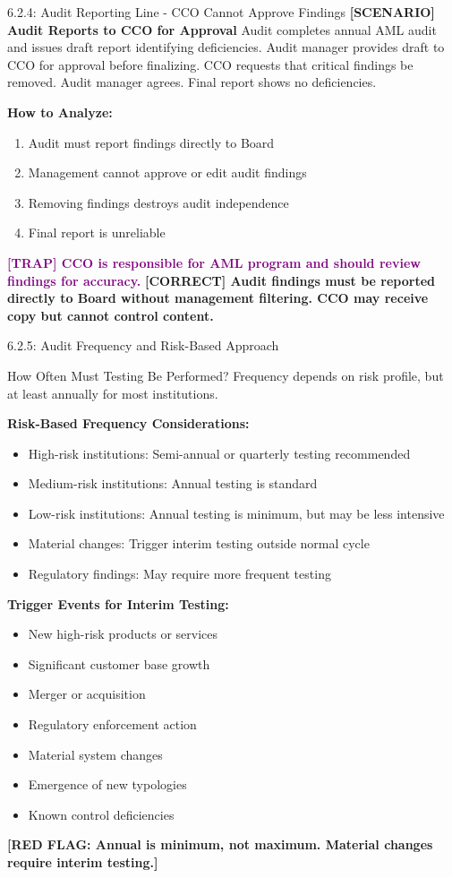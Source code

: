 \documentclass[11pt,a4paper]{beamer}
\newcommand{\trap}[1]{\textcolor{purple}{\textbf{[TRAP] #1}}}
\newcommand{\correct}[1]{\textcolor{green!50!black}{\textbf{[CORRECT] #1}}}
\newcommand{\scenario}[1]{\textcolor{blue!70!black}{\textbf{[SCENARIO] #1}}}
\newcommand{\redflag}[1]{\textcolor{red!80!black}{\textbf{[RED FLAG: #1]}}}
\begin{document}
\begin{frame}{6.2.4: Audit Reporting Line - CCO Cannot Approve Findings}
	\scenario{Audit Reports to CCO for Approval}
	Audit completes annual AML audit and issues draft report identifying deficiencies. Audit manager provides draft to CCO for approval before finalizing. CCO requests that critical findings be removed. Audit manager agrees. Final report shows no deficiencies.
	
	\vspace{0.1cm}
	\textbf{How to Analyze:}
	\begin{enumerate}
		\item Audit must report findings directly to Board
		\item Management cannot approve or edit audit findings
		\item Removing findings destroys audit independence
		\item Final report is unreliable
	\end{enumerate}
	\trap{CCO is responsible for AML program and should review findings for accuracy.}
	\correct{Audit findings must be reported directly to Board without management filtering. CCO may receive copy but cannot control content.}
\end{frame}

\begin{frame}{6.2.5: Audit Frequency and Risk-Based Approach}
	\begin{block}{How Often Must Testing Be Performed?}
		Frequency depends on risk profile, but at least annually for most institutions.
	\end{block}
	\textbf{Risk-Based Frequency Considerations:}
	\begin{itemize}
		\item High-risk institutions: Semi-annual or quarterly testing recommended
		\item Medium-risk institutions: Annual testing is standard
		\item Low-risk institutions: Annual testing is minimum, but may be less intensive
		\item Material changes: Trigger interim testing outside normal cycle
		\item Regulatory findings: May require more frequent testing
	\end{itemize}
	\textbf{Trigger Events for Interim Testing:}
	\begin{itemize}
		\item New high-risk products or services
		\item Significant customer base growth
		\item Merger or acquisition
		\item Regulatory enforcement action
		\item Material system changes
		\item Emergence of new typologies
		\item Known control deficiencies
	\end{itemize}
	\redflag{Annual is minimum, not maximum. Material changes require interim testing.}
\end{frame}
\end{document}
